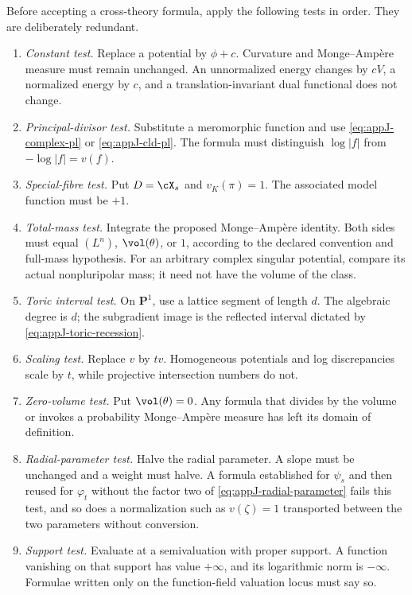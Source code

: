 Before accepting a cross-theory formula, apply the following tests in order.
They are deliberately redundant.

\begin{enumerate}
\item \emph{Constant test.}  Replace a potential by \(\phi+c\).  Curvature
  and Monge--Amp\`ere measure must remain unchanged.  An unnormalized energy
  changes by \(cV\), a normalized energy by \(c\), and a translation-invariant
  dual functional does not change.

\item \emph{Principal-divisor test.}  Substitute a meromorphic function and
  use \eqref{eq:appJ-complex-pl} or \eqref{eq:appJ-cld-pl}.  The formula must
  distinguish \(\log|f|\) from \(-\log|f|=v(f)\).

\item \emph{Special-fibre test.}  Put \(D=\cX_s\) and
  \(v_K(\pi)=1\).  The associated model function must be \(+1\).

\item \emph{Total-mass test.}  Integrate the proposed Monge--Amp\`ere
  identity.  Both sides must equal \((L^n)\), \(\vol(\theta)\), or \(1\),
  according to the declared convention and full-mass hypothesis. For an
  arbitrary complex singular potential, compare its actual nonpluripolar
  mass; it need not have the volume of the class.

\item \emph{Toric interval test.}  On \(\mathbf P^1\), use a lattice segment
  of length \(d\).  The algebraic degree is \(d\); the subgradient image is
  the reflected interval dictated by \eqref{eq:appJ-toric-recession}.

\item \emph{Scaling test.}  Replace \(v\) by \(tv\).  Homogeneous
  potentials and log discrepancies scale by \(t\), while projective
  intersection numbers do not.

\item \emph{Zero-volume test.}  Put \(\vol(\theta)=0\).  Any formula that
  divides by the volume or invokes a probability Monge--Amp\`ere measure has
  left its domain of definition.

\item \emph{Radial-parameter test.}  Halve the radial parameter.  A slope
  must be unchanged and a weight must halve.  A formula established for
  \(\psi_s\) and then reused for \(\varphi_t\) without the factor two of
  \eqref{eq:appJ-radial-parameter} fails this test, and so does a
  normalization such as \(v(\zeta)=1\) transported between the two
  parameters without conversion.

\item \emph{Support test.}  Evaluate at a semivaluation with proper support.
  A function vanishing on that support has value \(+\infty\), and its
  logarithmic norm is \(-\infty\).  Formulae written only on the
  function-field valuation locus must say so.
\end{enumerate}

